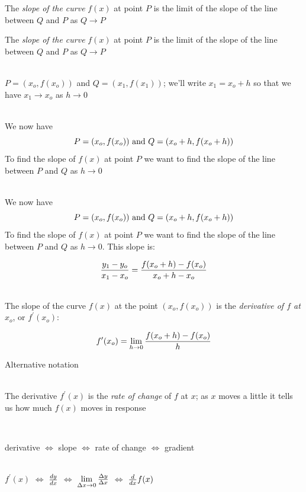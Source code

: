 \documentclass[10pt]{seminar}
\begin{document}
\begin{slide}
\newslide

The \textit{slope of the curve} $f(x)$ at point $P$ is the limit of the slope of the line between $Q$ and $P$ as $Q\rightarrow P$

\begin{center}
\end{center}

\newslide

The \textit{slope of the curve} $f(x)$ at point $P$ is the limit of the slope of the line between $Q$ and $P$ as $Q\rightarrow P$

\ \\$P=(x_o, f(x_o))$ and $Q=(x_1, f(x_1))$; we'll write $x_1=x_o+h$ so that we have $x_1\rightarrow x_o$ as $h\rightarrow 0$

\ \\We now have $$P=(x_o, f(x_o)) \hbox{ and }Q=(x_o+h, f(x_o+h))$$ To find the slope of $f(x) $ at point $P$ we want to find the slope of the line between $P$ and $Q$ as $h\rightarrow 0$

\newslide
\ \\We now have $$P=(x_o, f(x_o)) \hbox{ and }Q=(x_o+h, f(x_o+h))$$ To find the slope of $f(x) $ at point $P$ we want to find the slope of the line between $P$ and $Q$ as $h\rightarrow 0$. This slope is:


$${{y_1-y_o}\over{x_1-x_o}}= {{f(x_o+h)-f(x_o)}\over{x_o+h-x_o}}$$

\ \\The slope of the curve $f(x)$ at the point $(x_o, f(x_o))$ is the \textit{derivative of $f$ at $x_o$}, or $f^\prime(x_o)$:

$$f^\prime(x_o)=\lim_{h\rightarrow 0}{{f(x_o+h)-f(x_o)}\over{h}}$$

\newslide

Alternative notation

\ \\The derivative $f^\prime(x)$ is the \textit{rate of change} of $f$ at $x$; as $x$ moves a little it tells us how much $f(x)$ moves in response

\ \\ \begin{center}
derivative $\Leftrightarrow$ slope $\Leftrightarrow$ rate of change $\Leftrightarrow$ gradient

\ \\$f^\prime(x)$ $\Leftrightarrow$ ${{dy}\over {dx}}$ $\Leftrightarrow$ $\lim\limits_{\Delta x\rightarrow 0}{{\Delta y}\over{\Delta x}}$ $\Leftrightarrow$ ${{d}\over{dx}} f(x)$
\end{center}


\end{slide}
\end{document}
